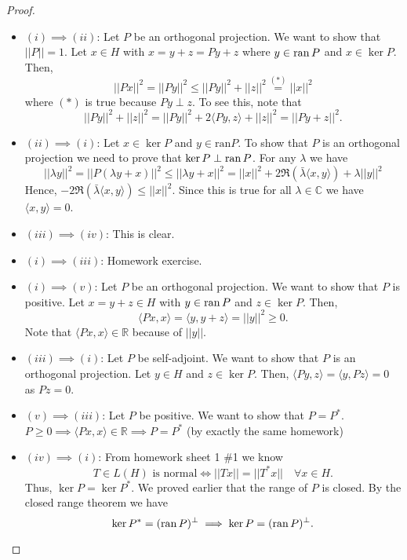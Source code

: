 \documentclass[9pt]{extarticle}
\begin{document}
\begin{proof}
\begin{itemize}
\item $(i) \implies (ii)$: Let $P$ be an orthogonal projection. We want to show that $||P|| = 1$. Let $x \in H$ with $x = y + z = Py + z$ where $y \in \operatorname{ran} P$ and $x \in \ker P$. Then,
\[
    ||Px||^2 = ||Py||^2 \leq ||Py||^2 + ||z||^2 \overset{(*)}{=} ||x||^2
\]
where $(*)$ is true because $Py \perp z$. To see this, note that $$||Py||^2 + ||z||^2 = ||Py||^2 + 2\langle Py, z \rangle + ||z||^2 = ||Py + z||^2.$$

\item $(ii) \implies (i)$: Let $x \in \ker P$ and $y \in \mathrm{ran} P$. To show that $P$ is an orthogonal projection we need to prove that $\ker P \perp \operatorname{ran} P$. For any $\lambda$ we have 
\[
    ||\lambda y||^2 = ||P(\lambda y + x)||^2 \leq ||\lambda y + x||^2 = || x||^2 + 2\Re(\bar \lambda \langle x, y \rangle) + \lambda ||y||^2    
\]
Hence, $-2\Re(\bar \lambda \langle x, y \rangle) \leq ||x||^2$. Since this is true for all $\lambda \in \mathbb{C}$ we have $\langle x,y \rangle = 0$.

\item $(iii) \implies (iv)$: This is clear.

\item $(i) \implies (iii)$: Homework exercise.

\item $(i) \implies (v)$: Let $P$ be an orthogonal projection. We want to show that $P$ is positive. Let $x = y + z \in H$ with $y \in \operatorname{ran} P$ and $z \in \ker P$. Then,
\[
    \langle Px, x \rangle = \langle y, y+z \rangle = ||y||^2 \geq 0.    
\]
Note that $\langle Px, x\rangle \in \mathbb{R}$ because of $||y||$.

\item $(iii) \implies (i)$: Let $P$ be self-adjoint. We want to show that $P$ is an orthogonal projection. Let $y \in H$ and $z \in \ker P$. Then, $\langle Py,z \rangle = \langle y, Pz \rangle = 0$ as $Pz = 0$.
\item $(v) \implies (iii)$: Let $P$ be positive. We want to show that $P = P^*$. $P \geq 0 \implies \langle Px, x \rangle \in \mathbb{R} \implies P = P^*$ (by exactly the same homework)

\item $(iv) \implies (i)$: From homework sheet 1 \#1 we know
\[
    T \in L(H) \text{ is normal} \iff ||Tx|| = ||T^*x|| \quad \forall x \in H.  
\]
Thus, $\ker P = \ker P^*$. We proved earlier that the range of $P$ is closed. By the closed range theorem we have 
\[
    \ker P^* = (\operatorname{ran} P)^\perp \implies \ker P = (\operatorname{ran} P)^\perp.
\]
\end{itemize}
\end{proof}
\end{document}
